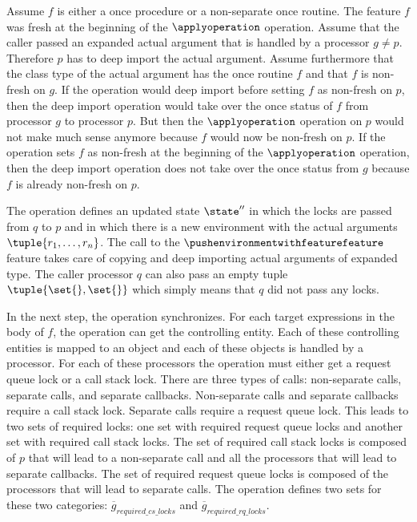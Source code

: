 \begin{clarification}
Assume $f$ is either a once procedure or a non-separate once routine. The feature $f$ was fresh at the beginning of the $\applyoperation$ operation. Assume that the caller passed an expanded actual argument that is handled by a processor $g \neq p$. Therefore $p$ has to deep import the actual argument. Assume furthermore that the class type of the actual argument has the once routine $f$ and that $f$ is non-fresh on $g$. If the operation would deep import before setting $f$ as non-fresh on $p$, then the deep import operation would take over the once status of $f$ from processor $g$ to processor $p$. But then the $\applyoperation$ operation on $p$ would not make much sense anymore because $f$ would now be non-fresh on $p$. If the operation sets $f$ as non-fresh at the beginning of the $\applyoperation$ operation, then the deep import operation does not take over the once status from $g$ because $f$ is already non-fresh on $p$.
\end{clarification}

The operation defines an updated state $\state''$ in which the locks are passed from $q$ to $p$ and in which there is a new environment with the actual arguments $\tuple{r_{1}, \ldots, r_{n}}$. The call to the $\pushenvironmentwithfeaturefeature$ feature takes care of copying and deep importing actual arguments of expanded type. The caller processor $q$ can also pass an empty tuple $\tuple{\set{}, \set{}}$ which simply means that $q$ did not pass any locks.

In the next step, the operation synchronizes. For each target expressions in the body of $f$, the operation can get the controlling entity. Each of these controlling entities is mapped to an object and each of these objects is handled by a processor. For each of these processors the operation must either get a request queue lock or a call stack lock. There are three types of calls: non-separate calls, separate calls, and separate callbacks. Non-separate calls and separate callbacks require a call stack lock. Separate calls require a request queue lock. This leads to two sets of required locks: one set with required request queue locks and another set with required call stack locks. The set of required call stack locks is composed of $p$ that will lead to a non-separate call and all the processors that will lead to separate callbacks. The set of required request queue locks is composed of the processors that will lead to separate calls. The operation defines two sets for these two categories: $\overline{g}_{required\_cs\_locks}$ and $\overline{g}_{required\_rq\_locks}$.

